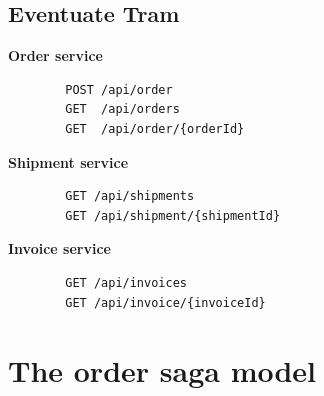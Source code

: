 \documentclass[oneside,
  digital, %
  table,   %
  nolof,     %
  nolot,     %
]{fithesis3}
\begin{document}
\section{Eventuate Tram}

\textbf{Order service}

\begin{verbatim}
        POST /api/order
        GET  /api/orders
        GET  /api/order/{orderId}
\end{verbatim}

\noindent
\textbf{Shipment service}

\begin{verbatim}
        GET /api/shipments
        GET /api/shipment/{shipmentId}
\end{verbatim}

\noindent
\textbf{Invoice service}

\begin{verbatim}
        GET /api/invoices
        GET /api/invoice/{invoiceId}
\end{verbatim}




\chapter{The order saga model}
\end{document}
